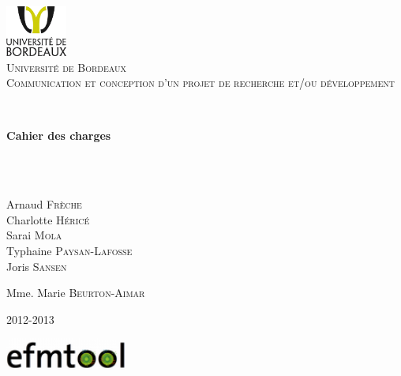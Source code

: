 \begin{titlepage}

\begin{center}

\includegraphics[width=0.15\textwidth]{logounibdx.png}\\[1cm]

\textsc{\LARGE Université de Bordeaux}\\[1.5cm]
\vspace*{2cm}
\textsc{\Large Communication et conception d'un projet de recherche et/ou développement}\\[0.5cm]

\vspace*{2cm}

\HRule \\[0.3cm]
{ \begin{Huge}
\bfseries Cahier des charges \end{Huge}}\\[0.3cm]

\HRule \\[1.3cm]
\begin{minipage}{0.4\textwidth}
\begin{center} \large
Arnaud \textsc{Frèche}\\
Charlotte \textsc{Héricé}\\
Sarai \textsc{Mola}\\
Typhaine \textsc{Paysan-Lafosse}\\
Joris \textsc{Sansen}\\
\end{center}
\end{minipage}
\begin{minipage}{0.4\textwidth}
\begin{flushright} \large
Mme. Marie \textsc{Beurton-Aimar}
\end{flushright}
\end{minipage}

\vfill

\begin{center}
2012-2013
\end{center}
\includegraphics[width=0.3\textwidth]{./efmtool.png}\\[1cm]

\end{center}

\end{titlepage}
%